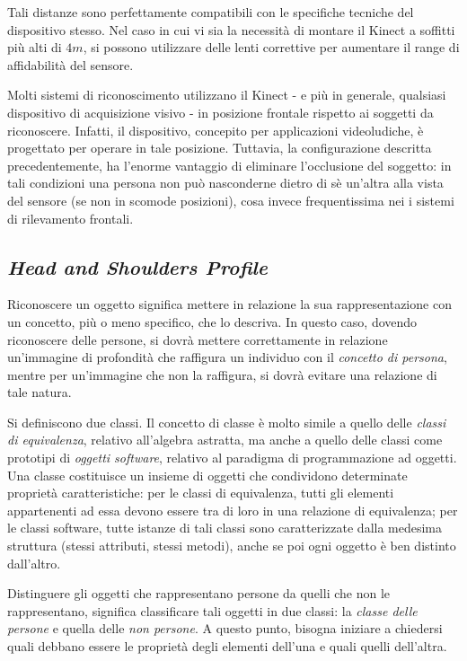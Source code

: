                 Tali distanze sono perfettamente compatibili con le specifiche tecniche del dispositivo stesso.
                Nel caso in cui vi sia la necessità di montare il Kinect a soffitti più alti di $4m$, si possono utilizzare delle lenti correttive per aumentare il range di affidabilità del sensore.

                Molti sistemi di riconoscimento utilizzano il Kinect - e più in generale, qualsiasi dispositivo di acquisizione visivo - in posizione frontale rispetto ai soggetti da riconoscere.
                Infatti, il dispositivo, concepito per applicazioni videoludiche, è progettato per operare in tale posizione.
                Tuttavia, la configurazione descritta precedentemente, ha l'enorme vantaggio di eliminare l'occlusione del soggetto: in tali condizioni una persona non può nasconderne dietro di sè un'altra alla vista del sensore (se non in scomode posizioni), cosa invece frequentissima nei i sistemi di rilevamento frontali.

        \subsection{\emph{Head and Shoulders Profile}}
        \label{sub:hasp}
            Riconoscere un oggetto significa mettere in relazione la sua rappresentazione con un concetto, più o meno specifico, che lo descriva.
            In questo caso, dovendo riconoscere delle persone, si dovrà mettere correttamente in relazione un'immagine di profondità che raffigura un individuo con il \emph{concetto di persona}, mentre per un'immagine che non la raffigura, si dovrà evitare una relazione di tale natura.
            
            Si definiscono due classi.
            Il concetto di classe è molto simile a quello delle \emph{classi di equivalenza}, relativo all'algebra astratta, ma anche a quello delle classi come prototipi di \emph{oggetti software}, relativo al paradigma di programmazione ad oggetti.
            Una classe costituisce un insieme di oggetti che condividono determinate proprietà caratteristiche: 
            per le classi di equivalenza, tutti gli elementi appartenenti ad essa devono essere tra di loro in una relazione di equivalenza;
            per le classi software, tutte istanze di tali classi sono caratterizzate dalla medesima struttura (stessi attributi, stessi metodi), anche se poi ogni oggetto è ben distinto dall'altro. 

            Distinguere gli oggetti che rappresentano persone da quelli che non le rappresentano, significa classificare tali oggetti in due classi: la \emph{classe delle persone} e quella delle \emph{non persone}.
            A questo punto, bisogna iniziare a chiedersi quali debbano essere le proprietà degli elementi dell'una e quali quelli dell'altra.


